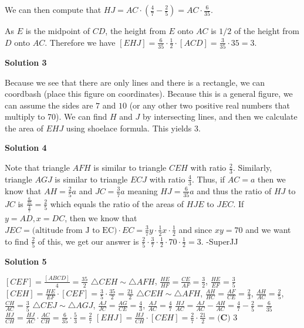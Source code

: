 \begin{enumerate}
 
	We can then compute that $HJ = AC \cdot \left( \frac 47 - \frac 25 \right) = AC \cdot \frac{6}{35}$. 

 
	As $E$ is the midpoint of $CD$, the height from $E$ onto $AC$ is $1/2$ of the height from $D$ onto $AC$. Therefore we have $[EHJ] = \frac{6}{35} \cdot \frac 12 \cdot [ACD] = \frac 3{35} \cdot 35 = \boxed{3}$.

 



\textbf{Solution 3}

Because we see that there are only lines and there is a rectangle, we can coordbash (place this figure on coordinates). Because this is a general figure, we can assume the sides are $7$ and $10$ (or any other two positive real numbers that multiply to 70). We can find $H$ and $J$ by intersecting lines, and then we calculate the area of $EHJ$ using shoelace formula. This yields $\boxed{3}$.

 



\textbf{Solution 4}

Note that triangle $AFH$ is similar to triangle $CEH$ with ratio $\frac{2}{3}$. Similarly, triangle $AGJ$ is similar to triangle $ECJ$ with ratio $\frac{4}{3}$. Thus, if $AC = a$ then we know that $AH = \frac{2}{5}a$ and $JC = \frac{3}{7}a$ meaning $HJ = \frac{6}{35}a$ and thus the ratio of $HJ$ to $JC$ is $\frac{\frac{6}{35}}{\frac{3}{7}} = \frac{2}{5}$ which equals the ratio of the areas of $HJE$ to $JEC$. If $y = AD, x = DC$, then we know that $JEC = \text{(altitude from J to EC)} \cdot EC = \frac{3}{7}y \cdot \frac{1}{2}x \cdot \frac{1}{2}$ and since $xy = 70$ and we want to find $\frac{2}{5}$ of this, we get our answer is $\frac{2}{5} \cdot \frac{3}{7} \cdot \frac{1}{2} \cdot 70 \cdot \frac{1}{2} = \boxed{3}$. -SuperJJ

 



\textbf{Solution 5}

$[CEF] = \frac{[ABCD]}{4} = \frac{35}{2}$
$\triangle CEH \sim \triangle AFH$, $\frac{HE}{HF} = \frac{CE}{AF} = \frac{3}{2}$, $\frac{HE}{EF} = \frac{3}{5}$
$[CEH] = \frac{HE}{EF} \cdot [CEF] = \frac{3}{5} \cdot \frac{35}{2} = \frac{21}{2}$
$\triangle CEH \sim \triangle AFH$, $\frac{AH}{HC} = \frac{AF}{CE} = \frac{2}{3}$, $\frac{AH}{AC} = \frac{2}{5}$, $\frac{CH}{AC} = \frac{3}{5}$
$\triangle CEJ \sim \triangle AGJ$, $\frac{AJ}{JC} = \frac{AG}{CE} = \frac{4}{3}$, $\frac{AJ}{AC} = \frac{4}{7}$
$\frac{HJ}{AC} = \frac{AJ}{AC} - \frac{AH}{AC} = \frac{4}{7} - \frac{2}{5} = \frac{6}{35}$
$\frac{HJ}{CH} = \frac{HJ}{AC} \cdot \frac{AC}{CH} = \frac{6}{35} \cdot \frac{5}{3} = \frac{2}{7}$
$[EHJ] = \frac{HJ}{CH} \cdot [CEH] = \frac{2}{7} \cdot \frac{21}{2} = \boxed{\textbf{(C) }3}$





\end{enumerate}
